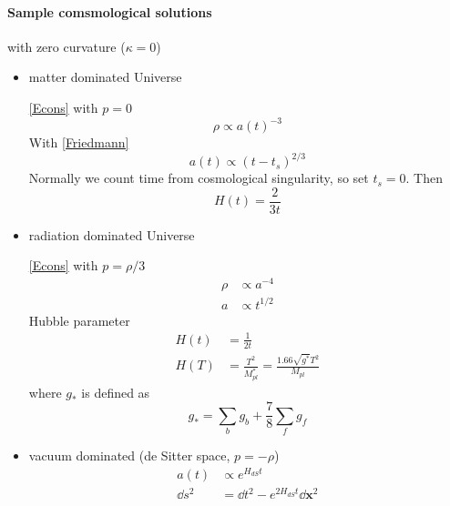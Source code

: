 \documentclass[12pt, a4paper, DIV=15]{article}
\numberwithin{equation}{section}
\begin{document}
\paragraph{Sample comsmological solutions} with zero curvature ($\kappa = 0$)
\begin{itemize}
   \item matter dominated Universe 

      \eqref{Econs} with $p=0$ 
      \begin{equation}
         \rho \propto a(t)^{-3}
      \end{equation}
      With \eqref{Friedmann}
      \begin{equation}
         a(t) \propto (t-t_s)^{2/3}
      \end{equation}
      Normally we count time from cosmological singularity, so set $t_s = 0$. Then
      \begin{equation}
         H(t) = \frac{2}{3t}
      \end{equation}

   \item radiation dominated Universe
      
      \eqref{Econs} with $p=\rho/3$
      \begin{align}
         \rho &\propto a^{-4} \\
         a &\propto t^{1/2}
      \end{align}
      Hubble parameter
      \begin{align}
         H(t) &= \frac{1}{2t} \\
         H(T) &= \frac{T^2}{M^*_{pl}} = \frac{1.66 \sqrt{g^*}T^2}{M_{pl}}
      \end{align}
      where $g_*$ is defined as
      \begin{equation}
         g_* = \sum_b g_b + \frac{7}{8} \sum_f g_f
      \end{equation}

   \item vacuum dominated (de Sitter space, $p = -\rho$)
         \begin{align}
            a(t) &\propto e^{H_{dS} t} \\
            \dd{s^2} &= \dd{t^2} - e^{2H_{dS}t} \dd{\pmb{x}^2}
         \end{align}

\end{itemize}
\end{document}
